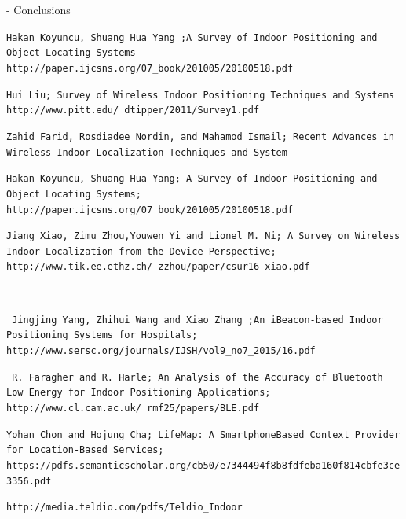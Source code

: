 \documentclass[a4paper]{IEEEtran}
\begin{document}
- Conclusions




\begin{thebibliography}{9}

 \texttt{Hakan Koyuncu, Shuang Hua Yang ;A Survey of Indoor Positioning and Object Locating Systems http://paper.ijcsns.org/07_book/201005/20100518.pdf}

 \texttt{Hui Liu; Survey of Wireless Indoor Positioning Techniques and Systems http://www.pitt.edu/~dtipper/2011/Survey1.pdf} 

 \texttt{Zahid Farid, Rosdiadee Nordin, and Mahamod Ismail; Recent Advances in Wireless Indoor Localization Techniques and System}

 \texttt{Hakan Koyuncu, Shuang Hua Yang; A Survey of Indoor Positioning and Object Locating Systems; http://paper.ijcsns.org/07_book/201005/20100518.pdf}

 \texttt{Jiang Xiao, Zimu Zhou,Youwen Yi and Lionel M. Ni; A Survey on Wireless Indoor Localization from the Device Perspective; http://www.tik.ee.ethz.ch/~zzhou/paper/csur16-xiao.pdf}

\texttt{ }

\texttt{ Jingjing Yang, Zhihui Wang and Xiao Zhang ;An iBeacon-based Indoor Positioning Systems for Hospitals; http://www.sersc.org/journals/IJSH/vol9_no7_2015/16.pdf}

\texttt{ R. Faragher and R. Harle; An Analysis of the Accuracy of Bluetooth Low Energy for Indoor Positioning Applications; http://www.cl.cam.ac.uk/~rmf25/papers/BLE.pdf}

\texttt{Yohan Chon and Hojung Cha; LifeMap: A SmartphoneBased Context Provider for Location-Based Services; https://pdfs.semanticscholar.org/cb50/e7344494f8b8fdfeba160f814cbfe3ce3356.pdf}

\texttt{http://media.teldio.com/pdfs/Teldio_Indoor}

 
 
\end{thebibliography}
\end{document}
